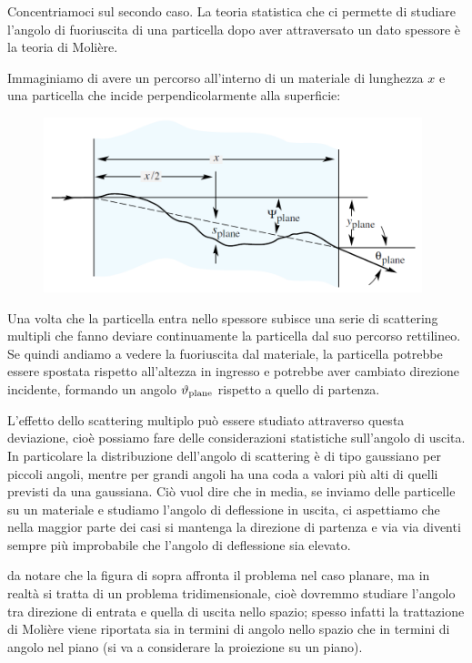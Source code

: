 Concentriamoci sul secondo caso. La teoria statistica che ci permette di studiare l'angolo di fuoriuscita di una particella dopo aver attraversato un dato spessore è la teoria di Molière.

Immaginiamo di avere un percorso all'interno di un materiale di lunghezza $x$ e una particella che incide perpendicolarmente alla superficie:

\begin{figure}[H]
    \centering
    \includegraphics[width=11cm]{immagini/scattering_multiplo_1.png}
\end{figure}

Una volta che la particella entra nello spessore subisce una serie di scattering multipli che fanno deviare continuamente la particella dal suo percorso rettilineo. Se quindi andiamo a vedere la fuoriuscita dal materiale, la particella potrebbe essere spostata rispetto all'altezza in ingresso e potrebbe aver cambiato direzione incidente, formando un angolo $\vartheta_{\rm plane}$ rispetto a quello di partenza.

\vspace{0.2cm}L'effetto dello scattering multiplo può essere studiato attraverso questa deviazione, cioè possiamo fare delle considerazioni statistiche sull'angolo di uscita. In particolare la distribuzione dell'angolo di scattering è di tipo gaussiano per piccoli angoli, mentre per grandi angoli ha una coda a valori più alti di quelli previsti da una gaussiana. Ciò vuol dire che in media, se inviamo delle particelle su un materiale e studiamo l'angolo di deflessione in uscita, ci aspettiamo che nella maggior parte dei casi si mantenga la direzione di partenza e via via diventi sempre più improbabile che l'angolo di deflessione sia elevato.

\E da notare che la figura di sopra affronta il problema nel caso planare, ma in realtà si tratta di un problema tridimensionale, cioè dovremmo studiare l'angolo tra direzione di entrata e quella di uscita nello spazio; spesso infatti la trattazione di Molière viene riportata sia in termini di angolo nello spazio che in termini di angolo nel piano (si va a considerare la proiezione su un piano).

